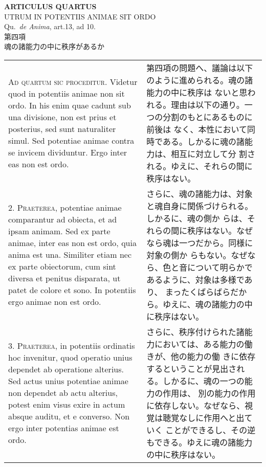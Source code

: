 \documentclass[paper=a4paper,fontsize=10pt,jafontsize=9pt,titlepage]{jlreq}
\begin{document}
\begin{center}
{\Large {\bfseries ARTICULUS QUARTUS}}\\
{\large UTRUM IN POTENTIIS ANIMAE SIT ORDO}\\
{\footnotesize Qu.~{\itshape de Anima}, art.13, ad 10.}\\
{\Large 第四項\\魂の諸能力の中に秩序があるか}
\end{center}

\begin{longtable}{p{21em}p{21em}}
{\scshape Ad quartum sic proceditur}. Videtur quod in potentiis animae
non sit ordo. In his enim quae cadunt sub una divisione, non est prius
et posterius, sed sunt naturaliter simul. Sed potentiae animae contra
se invicem dividuntur. Ergo inter eas non est ordo.

 
&

 第四項の問題へ、議論は以下のように進められる。魂の諸能力の中に秩序は
 ないと思われる。理由は以下の通り。一つの分割のもとにあるものに前後は
 なく、本性において同時である。しかるに魂の諸能力は、相互に対立して分
 割される。ゆえに、それらの間に秩序はない。


\\



2. {\scshape Praeterea}, potentiae animae comparantur ad obiecta, et
ad ipsam animam. Sed ex parte animae, inter eas non est ordo, quia
anima est una. Similiter etiam nec ex parte obiectorum, cum sint
diversa et penitus disparata, ut patet de colore et sono. In potentiis
ergo animae non est ordo.

 
&

さらに、魂の諸能力は、対象と魂自身に関係づけられる。しかるに、魂の側か
らは、それらの間に秩序はない。なぜなら魂は一つだから。同様に対象の側か
らもない。なぜなら、色と音について明らかであるように、対象は多様であり、
まったくばらばらだから。ゆえに、魂の諸能力の中に秩序はない。

\\




3. {\scshape Praeterea}, in potentiis ordinatis hoc invenitur, quod
operatio unius dependet ab operatione alterius. Sed actus unius
potentiae animae non dependet ab actu alterius, potest enim visus
exire in actum absque auditu, et e converso. Non ergo inter potentias
animae est ordo.
 
&

さらに、秩序付けられた諸能力においては、ある能力の働きが、他の能力の働
きに依存するということが見出される。しかるに、魂の一つの能力の作用は、
別の能力の作用に依存しない。なぜなら、視覚は聴覚なしに作用へと出ていく
ことができるし、その逆もできる。ゆえに魂の諸能力の中に秩序はない。
 


\end{longtable}
\end{document}
